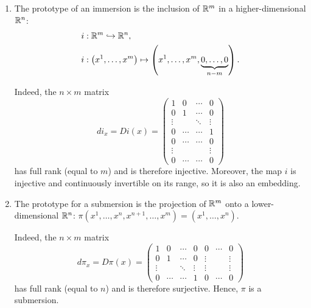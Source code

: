 \begin{example}
  \begin{enumerate}
    \item The prototype of an immersion is the inclusion of $\mathbb{R}^m$ in a higher-dimensional $\mathbb{R}^n$:
          \begin{align}
            i & : \R^m \hookrightarrow \R^n,                                                                                 \\
            i & : \left(x^1, \ldots, x^m\right) \mapsto \left(x^1, \ldots, x^m, \LaTeXunderbrace{0, \ldots, 0}_{n-m}\right).
          \end{align}

          Indeed, the $n\times m$ matrix
          \begin{equation}
            di_x = Di(x)
            = \begin{pmatrix}
              1      & 0      & \cdots & 0      \\
              0      & 1      & \cdots & 0      \\
              \vdots &        & \ddots & \vdots \\
              0      & \cdots & \cdots & 1      \\
              0      & \cdots & \cdots & 0      \\
              \vdots &        &        & \vdots \\
              0      & \cdots & \cdots & 0
            \end{pmatrix}
          \end{equation}
          has full rank (equal to $m$) and is therefore injective.
          Moreover, the map $i$ is injective and continuously invertible on its range, so it is also an embedding.

    \item The prototype for a submersion is the projection of $\mathbb{R}^m$ onto a lower-dimensional $\mathbb{R}^n$: $\pi\left(x^1,\ldots,x^n,x^{n+1},\ldots,x^m\right) = \left(x^1,\ldots,x^n\right)$.

          Indeed, the $n\times m$ matrix
          \begin{equation}
            d\pi_x = D\pi(x)
            = \begin{pmatrix}
              1      & 0      & \cdots & 0      & 0      & \cdots & 0      \\
              0      & 1      & \cdots & 0      & \vdots &        & \vdots \\
              \vdots &        & \ddots & \vdots & \vdots &        & \vdots \\
              0      & \cdots & \cdots & 1      & 0      & \cdots & 0
            \end{pmatrix}
          \end{equation}
          has full rank (equal to $n$) and is therefore surjective.
          Hence, $\pi$ is a submersion.


\end{enumerate}
\end{example}
